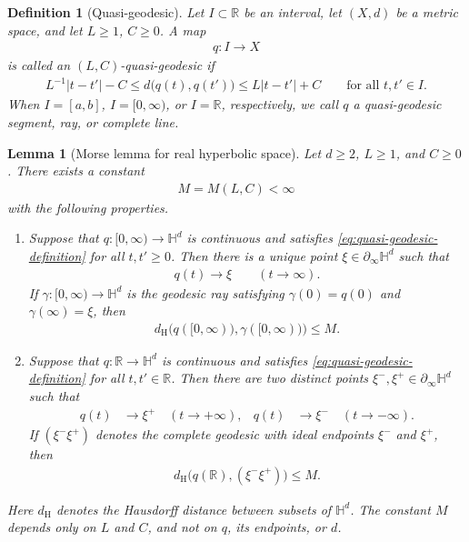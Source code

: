 \documentclass[11pt]{amsart}
\theoremstyle{plain}
\newtheorem{lemma}[theorem]{Lemma}
\theoremstyle{plain}
\newtheorem{definition}[theorem]{Definition}
\theoremstyle{plain}
\numberwithin{equation}{section}
\begin{document}
\begin{definition}[Quasi-geodesic]
\label{def:quasi-geodesic}
Let \(I\subset\mathbb R\) be an interval, let \((X,d)\) be a metric
space, and let \(L\geq1\), \(C\geq0\).  A map
\begin{align}
q:I\longrightarrow X
\nonumber
\end{align}
is called an \emph{\((L,C)\)-quasi-geodesic} if
\begin{align}
L^{-1}|t-t'|-C
\leq d\bigl(q(t),q(t')\bigr)
\leq L|t-t'|+C
\qquad\text{for all }t,t'\in I.
\label{eq:quasi-geodesic-definition}
\end{align}
When \(I=[a,b]\), \(I=[0,\infty)\), or \(I=\mathbb R\), respectively,
we call \(q\) a quasi-geodesic segment, ray, or complete line.
\end{definition}

\begin{lemma}[Morse lemma for real hyperbolic space]
\label{lem:Morse}
Let \(d\geq2\), \(L\geq1\), and \(C\geq0\).  There exists a constant
\begin{align}
M=M(L,C)<\infty
\nonumber
\end{align}
with the following properties.
\begin{enumerate}[label=\textup{(\roman*)},leftmargin=2.8em]
\item Suppose that \(q:[0,\infty)\to\mathbb H^d\) is continuous and
satisfies \eqref{eq:quasi-geodesic-definition} for all
\(t,t'\geq0\).  Then there is a unique point
\(\xi\in\partial_\infty\mathbb H^d\) such that
\begin{align}
q(t)\longrightarrow\xi
\qquad(t\to\infty).
\nonumber
\end{align}
If \(\gamma:[0,\infty)\to\mathbb H^d\) is the geodesic ray satisfying
\(\gamma(0)=q(0)\) and \(\gamma(\infty)=\xi\), then
\begin{align}
d_{\mathrm H}\bigl(q([0,\infty)),\gamma([0,\infty))\bigr)\leq M.
\nonumber
\end{align}

\item Suppose that \(q:\mathbb R\to\mathbb H^d\) is continuous and
satisfies \eqref{eq:quasi-geodesic-definition} for all
\(t,t'\in\mathbb R\).  Then there are two distinct points
\(\xi^-,\xi^+\in\partial_\infty\mathbb H^d\) such that
\begin{align}
q(t)&\longrightarrow\xi^+
\quad(t\to+\infty),
&
q(t)&\longrightarrow\xi^-
\quad(t\to-\infty).
\nonumber
\end{align}
If \((\xi^-\xi^+)\) denotes the complete geodesic with ideal endpoints
\(\xi^-\) and \(\xi^+\), then
\begin{align}
d_{\mathrm H}\bigl(q(\mathbb R),(\xi^-\xi^+)\bigr)\leq M.
\label{eq:Morse-line-conclusion}
\end{align}
\end{enumerate}
Here \(d_{\mathrm H}\) denotes the Hausdorff distance between subsets of
\(\mathbb H^d\).  The constant \(M\) depends only on \(L\) and \(C\), and
not on \(q\), its endpoints, or \(d\).
\end{lemma}
\end{document}
